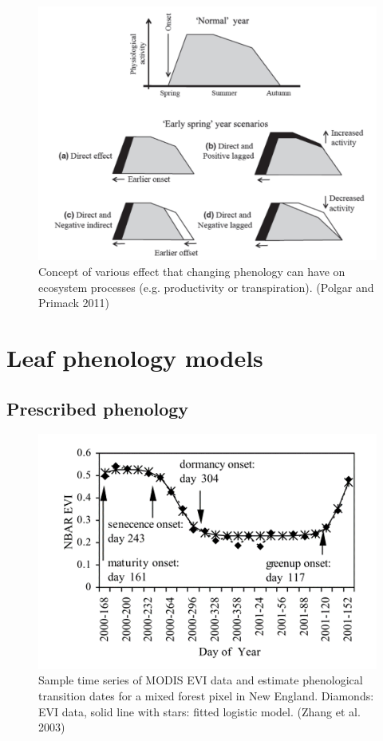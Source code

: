\documentclass[12pt,oneside]{book}
\begin{document}
\begin{figure}

{\centering \includegraphics[width=0.8\linewidth]{figures/chap4/f43_Polgar} 

}

\caption{Concept of various effect that changing phenology can have on ecosystem processes (e.g. productivity or transpiration). (Polgar and Primack 2011)}\label{fig:f43}
\end{figure}

\section{Leaf phenology models}\label{leaf-phenology-models}

\subsection{Prescribed phenology}\label{prescribed-phenology}

\begin{figure}

{\centering \includegraphics[width=0.8\linewidth]{figures/chap4/f44_zhang} 

}

\caption{Sample time series of MODIS EVI data and estimate phenological transition dates for a mixed forest pixel in New England. Diamonds: EVI data, solid line with stars: fitted logistic model. (Zhang et al. 2003)}\label{fig:f44}
\end{figure}
\end{document}
